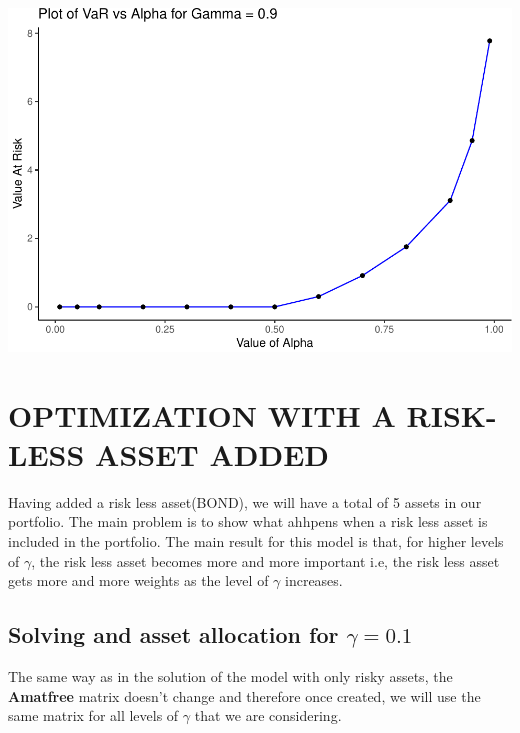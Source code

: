\documentclass[]{article}
\begin{document}
\includegraphics{Integrated_Management_Formulation_Model_files/figure-latex/unnamed-chunk-22-1.pdf}

\section{OPTIMIZATION WITH A RISK-LESS ASSET
ADDED}\label{optimization-with-a-risk-less-asset-added}

Having added a risk less asset(BOND), we will have a total of 5 assets
in our portfolio. The main problem is to show what ahhpens when a risk
less asset is included in the portfolio. The main result for this model
is that, for higher levels of \(\gamma\), the risk less asset becomes
more and more important i.e, the risk less asset gets more and more
weights as the level of \(\gamma\) increases.

\subsection{\texorpdfstring{Solving and asset allocation for
\(\gamma = 0.1\)}{Solving and asset allocation for \textbackslash{}gamma = 0.1}}\label{solving-and-asset-allocation-for-gamma-0.1}

The same way as in the solution of the model with only risky assets, the
\textbf{Amatfree} matrix doesn't change and therefore once created, we
will use the same matrix for all levels of \(\gamma\) that we are
considering.
\end{document}
